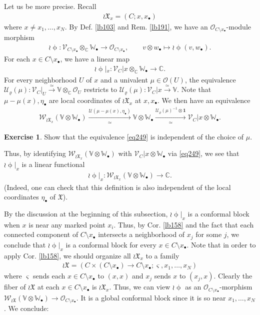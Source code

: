 \documentclass[11pt,b5paper,notitlepage]{article}
\theoremstyle{definition}
\newtheorem{exe}[df]{Exercise}
\theoremstyle{plain}
\newcommand{\fk}{\mathfrak}
\newcommand{\mc}{\mathcal}
\newcommand{\id}{\mathbf{1}}
\newcommand{\scr}{\mathscr}
\newcommand{\sgm}{\varsigma}
\newcommand{\blt}{\bullet}
\newcommand{\Vbb}{\mathbb V}
\newcommand{\Wbb}{\mathbb W}
\newcommand{\Cbb}{\mathbb C}
\numberwithin{equation}{section}
\begin{document}
Let us be more precise. Recall
\begin{align}
\wr\fk X_x=(C;x,x_\blt)
\end{align}
where $x\neq x_1,\dots,x_N$. By Def. \ref{lb103} and Rem. \ref{lb191}, we have an $\scr O_{C\setminus x_\blt}$-module morphism
\begin{align}
\wr\upphi:\scr V_{C\setminus x_\blt}\otimes_\Cbb\Wbb_\blt\rightarrow\scr O_{C\setminus x_\blt},\qquad v\otimes w_\blt\mapsto\wr\upphi(v,w_\blt).
\end{align}
For each $x\in C\setminus x_\blt$, we have a linear map
\begin{align}
\wr\upphi|_x:\scr V_C|x\otimes_\Cbb\Wbb_\blt\rightarrow\Cbb.
\end{align}
For every neighborhood $U$ of $x$ and a univalent $\mu\in\scr O(U)$, the equivalence $\mc U_\varrho(\mu):\scr V_C|_U\xrightarrow{\simeq}\Vbb\otimes_\Cbb\scr O_U$ restricts to $\mc U_\varrho(\mu):\scr V_C|x\xrightarrow{\simeq}\Vbb$. Note that $\mu-\mu(x),\eta_\blt$ are local coordinates of $\wr\fk X_x$ at $x,x_\blt$. We then have an equivalence
\begin{align}
\scr W_{\wr\fk X_x}(\Vbb\otimes\Wbb_\blt)\xrightarrow[\simeq]{\mc U(\mu-\mu(x),\eta_\blt)} \Vbb\otimes\Wbb_\blt\xrightarrow[\simeq]{\mc U_\varrho(\mu)^{-1}\otimes\id}\scr V_C|x\otimes\Wbb_\blt.\label{eq249}
\end{align}
\begin{exe}
Show that the equivalence \eqref{eq249} is independent of the choice of $\mu$.
\end{exe}
Thus, by identifying $\scr W_{\wr\fk X_x}(\Vbb\otimes\Wbb_\blt)$ with $\scr V_C|x\otimes\Wbb_\blt$ via \eqref{eq249}, we see that $\wr\upphi|_x$ is a linear functional
\begin{align}
\wr\upphi|_x:\scr W_{\wr\fk X_x}(\Vbb\otimes\Wbb_\blt)\rightarrow\Cbb.
\end{align}
(Indeed, one can check that this definition is also independent of the local coordinates $\eta_\blt$ of $\fk X$).

By the discussion at the beginning of this subsection, $\wr\upphi|_x$ is a conformal block when $x$ is near any marked point $x_i$. Thus,  by Cor. \ref{lb158} and the fact that each connected component of $C\setminus x_\blt$ intersects a neighborhood of $x_j$ for some $j$, we conclude that $\wr\upphi|_x$ is a conformal block for every $x\in C\setminus x_\blt$. Note that in order to apply Cor. \ref{lb158}, we should organize all $\wr\fk X_x$ to a family
\begin{align}
\wr\fk X=(C\times (C\setminus x_\blt)\rightarrow C\setminus x_\blt;\sgm,x_1,\dots,x_N)
\end{align}
where $\sgm$ sends each $x\in C\setminus x_\blt$ to $(x,x)$ and $x_j$ sends $x$ to $(x_j,x)$. Clearly the fiber of $\wr\fk X$ at each $x\in C\setminus x_\blt$ is $\wr\fk X_x$. Thus, we can view $\wr\upphi$ as an $\scr O_{C\setminus x_\blt}$-morphism $\scr W_{\wr\fk X}(\Vbb\otimes\Wbb_\blt)\rightarrow\scr O_{C\setminus x_\blt}$. It is a global conformal block since it is so near $x_1,\dots,x_N$. We conclude:
\end{document}
